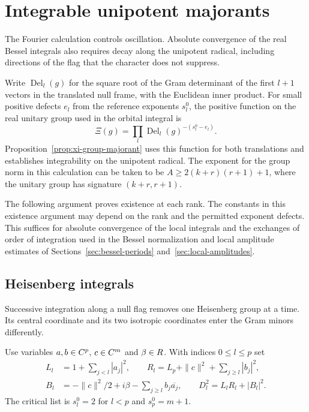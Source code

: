 \section{Integrable unipotent majorants}
\label{sec:xi}

The Fourier calculation controls oscillation. Absolute convergence of the real Bessel integrals also requires decay along the unipotent radical, including directions of the flag that the character does not suppress.

Write \(\operatorname{Del}_l(g)\) for the square root of the Gram determinant of the first \(l+1\) vectors in the translated null frame, with the Euclidean inner product. For small positive defects \(e_l\) from the reference exponents \(s_l^0\), the positive function on the real unitary group used in the orbital integral is 
\[
 \Xi(g)=\prod_l\operatorname{Del}_l(g)^{-(s_l^0-e_l)}.
\]
 Proposition~\ref{prop:xi-group-majorant} uses this function for both translations and establishes integrability on the unipotent radical. The exponent for the
group norm in this calculation can be taken to be
\(A\ge 2(k+r)(r+1)+1\), where the unitary group has signature
\((k+r,r+1)\). 

The following argument proves existence at each rank. The constants in this existence argument may
depend on the rank and the permitted exponent defects.
This suffices for absolute convergence of the local integrals
and the exchanges of order of integration used in the Bessel
normalization and local amplitude estimates of
Sections~\ref{sec:bessel-periods} and~\ref{sec:local-amplitudes}.

\subsection{Heisenberg integrals}

Successive integration along a null flag removes one Heisenberg group at a time. Its central coordinate and its two isotropic coordinates enter the Gram minors differently.

Use variables \(a,b\in C^p\), \(c\in C^m\) and \(\beta\in R\).
With indices \(0\le l\le p\) set
\[
 \begin{split}
 L_l&=1+\sum_{j<l}|a_j|^2,\qquad
 R_l=L_p+\|c\|^2+\sum_{j\ge l}|b_j|^2,\\
 B_l&=-\|c\|^2/2+i\beta-\sum_{j\ge l}b_j\overline{a_j},
 \qquad D_l^2=L_lR_l+|B_l|^2.
 \end{split}
\]
The critical list is \(s_l^0=2\) for \(l<p\) and
\(s_p^0=m+1\).

